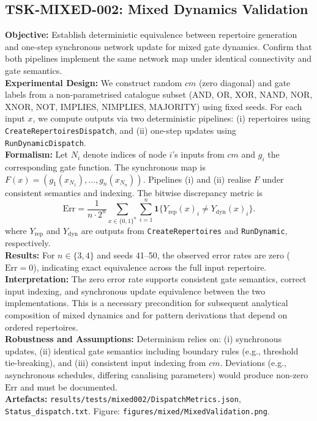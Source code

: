 \documentclass{article}
\begin{document}
\subsection{TSK-MIXED-002: Mixed Dynamics Validation}
\textbf{Objective:} Establish deterministic equivalence between repertoire generation and one-step synchronous network update for mixed gate dynamics. Confirm that both pipelines implement the same network map under identical connectivity and gate semantics.\\
\textbf{Experimental Design:} We construct random \(cm\) (zero diagonal) and gate labels from a non-parametrised catalogue subset (AND, OR, XOR, NAND, NOR, XNOR, NOT, IMPLIES, NIMPLIES, MAJORITY) using fixed seeds. For each input \(x\), we compute outputs via two deterministic pipelines: (i) repertoires using \texttt{CreateRepertoiresDispatch}, and (ii) one-step updates using \texttt{RunDynamicDispatch}.\\
\textbf{Formalism:} Let \(N_i\) denote indices of node \(i\)'s inputs from \(cm\) and \(g_i\) the corresponding gate function. The synchronous map is \(F(x) = (g_1(x_{N_1}),\dots,g_n(x_{N_n}))\). Pipelines (i) and (ii) realise \(F\) under consistent semantics and indexing. The bitwise discrepancy metric is
\begin{equation*}
\mathrm{Err} = \frac{1}{n\cdot 2^n} \sum_{x \in \{0,1\}^n} \sum_{i=1}^n \mathbf{1}\big\{Y_{\mathrm{rep}}(x)_i \neq Y_{\mathrm{dyn}}(x)_i\big\}.
\end{equation*}
where \(Y_{\mathrm{rep}}\) and \(Y_{\mathrm{dyn}}\) are outputs from \texttt{CreateRepertoires} and \texttt{RunDynamic}, respectively.\\
\textbf{Results:} For \(n\in\{3,4\}\) and seeds 41–50, the observed error rates are zero (\(\mathrm{Err}=0\)), indicating exact equivalence across the full input repertoire.\\
\textbf{Interpretation:} The zero error rate supports consistent gate semantics, correct input indexing, and synchronous update equivalence between the two implementations. This is a necessary precondition for subsequent analytical composition of mixed dynamics and for pattern derivations that depend on ordered repertoires.\\
\textbf{Robustness and Assumptions:} Determinism relies on: (i) synchronous updates, (ii) identical gate semantics including boundary rules (e.g., threshold tie-breaking), and (iii) consistent input indexing from \(cm\). Deviations (e.g., asynchronous schedules, differing canalising parameters) would produce non-zero \(\mathrm{Err}\) and must be documented.\\
\textbf{Artefacts:} \texttt{results/tests/mixed002/DispatchMetrics.json}, \texttt{Status\_dispatch.txt}. Figure: \texttt{figures/mixed/MixedValidation.png}.\\
\end{document}
